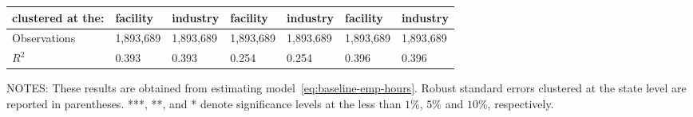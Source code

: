\begin{table}[H]
{\begin{tabular}{@{}lllllll@{}}
            clustered at the: & facility  & industry  & facility  & industry  & facility  & industry  \\ \midrule
            Observations      & 1,893,689 & 1,893,689 & 1,893,689 & 1,893,689 & 1,893,689 & 1,893,689 \\
            $R^2$             & 0.393     & 0.393     & 0.254     & 0.254     & 0.396     & 0.396     \\ \bottomrule \bottomrule
        \end{tabular}%
    }
    \begin{minipage}{\columnwidth}
        \vspace{0.05in}
        \tiny NOTES: These results are obtained from estimating model~\ref{eq:baseline-emp-hours}. Robust standard errors clustered at the state level are reported in parentheses. ***, **, and * denote significance levels at the less than $1\%$, $5\%$ and $10\%$, respectively.
    \end{minipage}
\end{table}